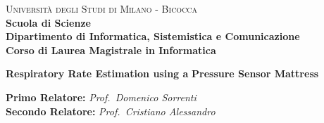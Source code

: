 \documentclass[a4paper,12pt, oneside]{book}
\begin{document}
{} 
\begin{titlepage}
  

  \noindent
  \begin{minipage}[t]{0.19\textwidth}
  \end{minipage}
  \begin{minipage}[t]{0.81\textwidth}
    {
      {\textsc{Università degli Studi di Milano - Bicocca}} \\
      \textbf{Scuola di Scienze} \\
      \textbf{Dipartimento di Informatica, Sistemistica e Comunicazione} \\
      \textbf{Corso di Laurea Magistrale in Informatica} \\
      \par
    }
  \end{minipage}
  
  \vspace{40mm}
  
  \begin{center}
    {\LARGE{
        \textbf{Respiratory Rate Estimation using a\vspace{5mm}}}}
    {\LARGE{
        \textbf{ Pressure Sensor Mattress}}}
    
  \end{center}
  
  \vspace{43mm}

  \noindent
  {\large \textbf{Primo Relatore:} \textit{Prof.~Domenico Sorrenti}} \\

  \noindent
  {\large \textbf{Secondo Relatore:} \textit{Prof.~Cristiano Alessandro}}\\
  

\end{titlepage}
\end{document}
